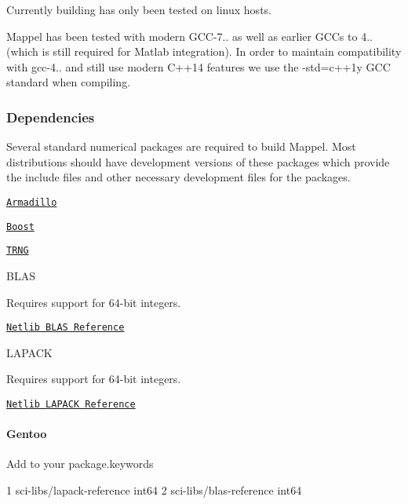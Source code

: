 Currently building has only been tested on linux hosts.

Mappel has been tested with modern G\+C\+C-\/7.. as well as earlier G\+CC\textquotesingle{}s to 4.. (which is still required for Matlab integration). In order to maintain compatibility with gcc-\/4.. and still use modern C++14 features we use the {\ttfamily -\/std=c++1y} G\+CC standard when compiling.

\subsubsection*{Dependencies}

Several standard numerical packages are required to build Mappel. Most distributions should have development versions of these packages which provide the include files and other necessary development files for the packages.


\begin{DoxyItemize}
\item \href{http://arma.sourceforge.net/}{\tt Armadillo}
\item \href{http://www.boost.org/}{\tt Boost}
\item \href{https://github.com/rabauke/trng4}{\tt T\+R\+NG}
\item B\+L\+AS
\begin{DoxyItemize}
\item Requires support for 64-\/bit integers.
\item \href{http://www.netlib.org/blas/}{\tt Netlib B\+L\+AS Reference}
\end{DoxyItemize}
\item L\+A\+P\+A\+CK
\begin{DoxyItemize}
\item Requires support for 64-\/bit integers.
\item \href{http://www.netlib.org/lapack/}{\tt Netlib L\+A\+P\+A\+CK Reference}
\end{DoxyItemize}
\end{DoxyItemize}

\paragraph*{Gentoo}

Add to your {\ttfamily package.\+keywords}


\begin{DoxyCode}
1 sci-libs/lapack-reference int64
2 sci-libs/blas-reference int64
\end{DoxyCode}



